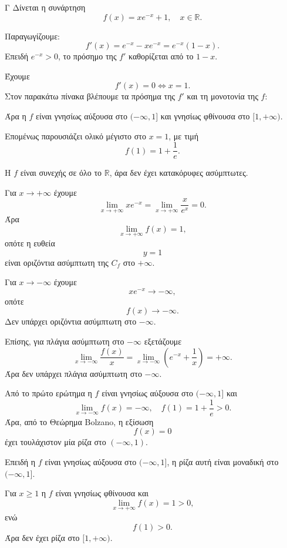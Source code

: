 \begin{thema}{Γ}
Δίνεται η συνάρτηση
\[
f(x)=xe^{-x}+1,\quad x\in\mathbb{R}.
\]
\begin{erwthma}
\item Παραγωγίζουμε:
\[
f'(x)=e^{-x}-xe^{-x}=e^{-x}(1-x).
\]
Επειδή $e^{-x}>0$, το πρόσημο της $f'$ καθορίζεται από το $1-x$.

Έχουμε
\[
f'(x)=0\Leftrightarrow x=1.
\]
Στον παρακάτω πίνακα βλέπουμε τα πρόσημα της $f'$ και τη μονοτονία της $f$:
\begin{center}
\end{center}

Άρα η $f$ είναι γνησίως αύξουσα στο $(-\infty,1]$ και γνησίως φθίνουσα στο $[1,+\infty)$.

Επομένως παρουσιάζει ολικό μέγιστο στο $x=1$, με τιμή
\[
f(1)=1+\frac1e.
\]

\item Η $f$ είναι συνεχής σε όλο το $\mathbb{R}$, άρα δεν έχει κατακόρυφες ασύμπτωτες.

Για $x\to+\infty$ έχουμε
\[
\lim_{x\to+\infty}xe^{-x}
=\lim_{x\to+\infty}\frac{x}{e^x}=0.
\]
Άρα
\[
\lim_{x\to+\infty}f(x)=1,
\]
οπότε η ευθεία
\[
{y=1}
\]
είναι οριζόντια ασύμπτωτη της $C_f$ στο $+\infty$.

Για $x\to-\infty$ έχουμε
\[
xe^{-x}\to-\infty,
\]
οπότε
\[
f(x)\to-\infty.
\]
Δεν υπάρχει οριζόντια ασύμπτωτη στο $-\infty$.

Επίσης, για πλάγια ασύμπτωτη στο $-\infty$ εξετάζουμε
\[
\lim_{x\to-\infty}\frac{f(x)}{x}
=\lim_{x\to-\infty}\left(e^{-x}+\frac1x\right)
=+\infty.
\]
Άρα δεν υπάρχει πλάγια ασύμπτωτη στο $-\infty$.

\item Από το πρώτο ερώτημα η $f$ είναι γνησίως αύξουσα στο $(-\infty,1]$ και
\[
\lim_{x\to-\infty}f(x)=-\infty,
\quad
f(1)=1+\frac1e>0.
\]
Άρα, από το Θεώρημα Bolzano, η εξίσωση
\[
f(x)=0
\]
έχει τουλάχιστον μία ρίζα στο $(-\infty,1)$.

Επειδή η $f$ είναι γνησίως αύξουσα στο $(-\infty,1]$, η ρίζα αυτή είναι μοναδική στο $(-\infty,1]$.

Για $x\geq1$ η $f$ είναι γνησίως φθίνουσα και
\[
\lim_{x\to+\infty}f(x)=1>0,
\]
ενώ
\[
f(1)>0.
\]
Άρα δεν έχει ρίζα στο $[1,+\infty)$.


\end{erwthma}
\end{thema}
